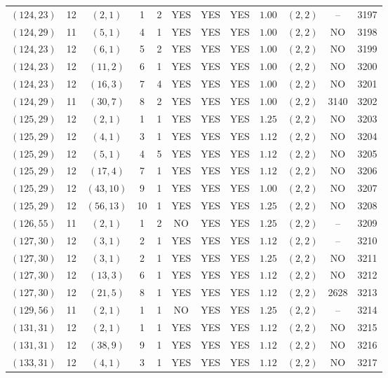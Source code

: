 \begin{longtable}{|c|c|c|c|c|c|c|c|c|c|c|c|}
$(124,23)$ & 12 & $(2,1)$ & 1 & 2 & YES & YES & YES & $1.00$ & $(2,2)$ & -- & 3197\\
$(124,29)$ & 11 & $(5,1)$ & 4 & 1 & YES & YES & YES & $1.00$ & $(2,2)$ & NO & 3198\\
$(124,23)$ & 12 & $(6,1)$ & 5 & 2 & YES & YES & YES & $1.00$ & $(2,2)$ & NO & 3199\\
$(124,23)$ & 12 & $(11,2)$ & 6 & 1 & YES & YES & YES & $1.00$ & $(2,2)$ & NO & 3200\\
$(124,23)$ & 12 & $(16,3)$ & 7 & 4 & YES & YES & YES & $1.00$ & $(2,2)$ & NO & 3201\\
$(124,29)$ & 11 & $(30,7)$ & 8 & 2 & YES & YES & YES & $1.00$ & $(2,2)$ & 3140 & 3202\\
$(125,29)$ & 12 & $(2,1)$ & 1 & 1 & YES & YES & YES & $1.25$ & $(2,2)$ & NO & 3203\\
$(125,29)$ & 12 & $(4,1)$ & 3 & 1 & YES & YES & YES & $1.12$ & $(2,2)$ & NO & 3204\\
$(125,29)$ & 12 & $(5,1)$ & 4 & 5 & YES & YES & YES & $1.12$ & $(2,2)$ & NO & 3205\\
$(125,29)$ & 12 & $(17,4)$ & 7 & 1 & YES & YES & YES & $1.12$ & $(2,2)$ & NO & 3206\\
$(125,29)$ & 12 & $(43,10)$ & 9 & 1 & YES & YES & YES & $1.00$ & $(2,2)$ & NO & 3207\\
$(125,29)$ & 12 & $(56,13)$ & 10 & 1 & YES & YES & YES & $1.25$ & $(2,2)$ & NO & 3208\\
$(126,55)$ & 11 & $(2,1)$ & 1 & 2 & NO & YES & YES & $1.25$ & $(2,2)$ & -- & 3209\\
$(127,30)$ & 12 & $(3,1)$ & 2 & 1 & YES & YES & YES & $1.12$ & $(2,2)$ & -- & 3210\\
$(127,30)$ & 12 & $(3,1)$ & 2 & 1 & YES & YES & YES & $1.25$ & $(2,2)$ & NO & 3211\\
$(127,30)$ & 12 & $(13,3)$ & 6 & 1 & YES & YES & YES & $1.12$ & $(2,2)$ & NO & 3212\\
$(127,30)$ & 12 & $(21,5)$ & 8 & 1 & YES & YES & YES & $1.12$ & $(2,2)$ & 2628 & 3213\\
$(129,56)$ & 11 & $(2,1)$ & 1 & 1 & NO & YES & YES & $1.25$ & $(2,2)$ & -- & 3214\\
$(131,31)$ & 12 & $(2,1)$ & 1 & 1 & YES & YES & YES & $1.12$ & $(2,2)$ & NO & 3215\\
$(131,31)$ & 12 & $(38,9)$ & 9 & 1 & YES & YES & YES & $1.12$ & $(2,2)$ & NO & 3216\\
$(133,31)$ & 12 & $(4,1)$ & 3 & 1 & YES & YES & YES & $1.12$ & $(2,2)$ & NO & 3217\\

\end{longtable}
